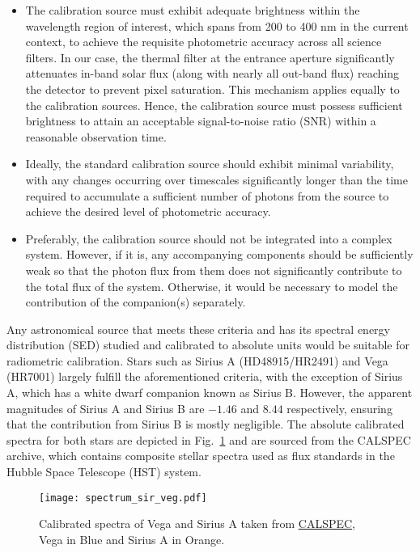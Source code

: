 \begin{itemize}
    \item The calibration source must exhibit adequate brightness within the wavelength region of interest, which spans from 200 to 400 nm in the current context, to achieve the requisite photometric accuracy across all science filters. In our case, the thermal filter at the entrance aperture significantly attenuates in-band solar flux (along with nearly all out-band flux) reaching the detector to prevent pixel saturation. This mechanism applies equally to the calibration sources. Hence, the calibration source must possess sufficient brightness to attain an acceptable signal-to-noise ratio (SNR) within a reasonable observation time.
    \item Ideally, the standard calibration source should exhibit minimal variability, with any changes occurring over timescales significantly longer than the time required to accumulate a sufficient number of photons from the source to achieve the desired level of photometric accuracy.
    \item  Preferably, the calibration source should not be integrated into a complex system. However, if it is, any accompanying components should be sufficiently weak so that the photon flux from them does not significantly contribute to the total flux of the system. Otherwise, it would be necessary to model the contribution of the companion(s) separately.
\end{itemize}

Any astronomical source that meets these criteria and has its spectral energy distribution (SED) studied and calibrated to absolute units would be suitable for radiometric calibration. Stars such as Sirius A (HD48915/HR2491) and Vega (HR7001) largely fulfill the aforementioned criteria, with the exception of Sirius A, which has a white dwarf companion known as Sirius B. However, the apparent magnitudes of Sirius A and Sirius B are $-1.46$ \citep{hoffleit91} and $8.44$ \citep{mccook99,holberg13} respectively, ensuring that the contribution from Sirius B is mostly negligible. The absolute calibrated spectra for both stars are depicted in Fig.~\ref{fig:spec_1} and are sourced from the CALSPEC archive, which contains composite stellar spectra used as flux standards in the Hubble Space Telescope (HST) system.

\begin{figure}
    \centering
    \texttt{[image: spectrum\_sir\_veg.pdf]}
    \caption{Calibrated spectra of Vega and Sirius A taken from \href{https://www.stsci.edu/hst/instrumentation/reference-data-for-calibration-and-tools/astronomical-catalogs/calspec}{CALSPEC}, Vega in Blue and Sirius A in Orange.}
    \label{fig:spec_1}
\end{figure}

